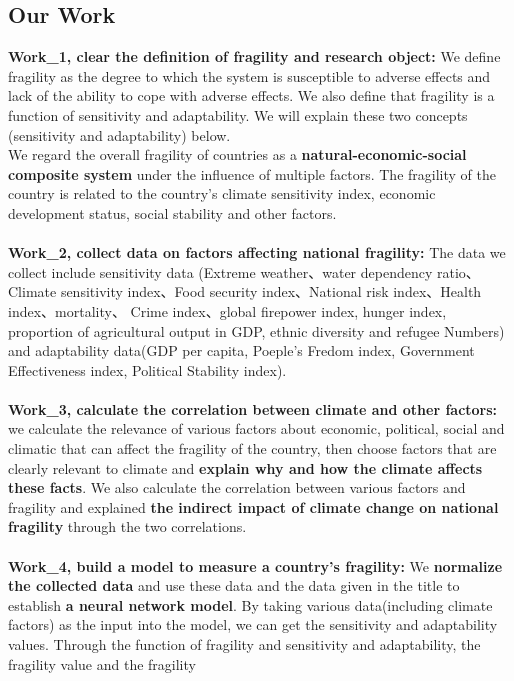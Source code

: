 \documentclass{mcmthesis}
\begin{document}
\subsection{Our Work}
  \textbf{Work\_1, clear the definition of fragility and research object:} We 
  define fragility as the degree to which the system is susceptible to adverse effects 
  and lack of the ability to cope with adverse effects. We also define that fragility 
  is a function of sensitivity and adaptability. We will explain these two concepts 
  (sensitivity and adaptability) below.\\ We regard the overall fragility of 
  countries as a \textbf{natural-economic-social composite system} under the influence of 
  multiple factors. The fragility of the country is related to the country's 
  climate sensitivity index, economic development status, social stability and 
  other factors.\\\\
  \textbf{Work\_2, collect data on factors affecting national fragility:} The data we
  collect include sensitivity data (Extreme weather、water dependency ratio、Climate
  sensitivity index、Food security index、National risk index、Health index、mortality、
  Crime index、global firepower index, hunger index,  proportion of agricultural output 
  in GDP, ethnic diversity and refugee Numbers) and adaptability data(GDP per capita, 
  Poeple's Fredom index, Government Effectiveness index, Political Stability index).\\\\
  \textbf{Work\_3, calculate the correlation between climate and other factors:}  
  we calculate the relevance of various factors about economic, political, social and climatic 
  that can affect the fragility of the country, then choose factors that are clearly relevant 
  to climate and \textbf{explain why and how the climate affects these facts}. We also calculate the 
  correlation between various factors and fragility and explained \textbf{the indirect impact of 
  climate change on national fragility} through the two correlations.\\\\
  \textbf{Work\_4, build a model to measure a country's fragility:} We \textbf{normalize the collected 
  data} and use these data and the data given in the title to 
  establish \textbf{a neural network model}. By taking various data(including climate factors) as the 
  input into the model, we can get the sensitivity and adaptability values. Through the function 
  of fragility and sensitivity and adaptability, the fragility value and the fragility 
\end{document}
